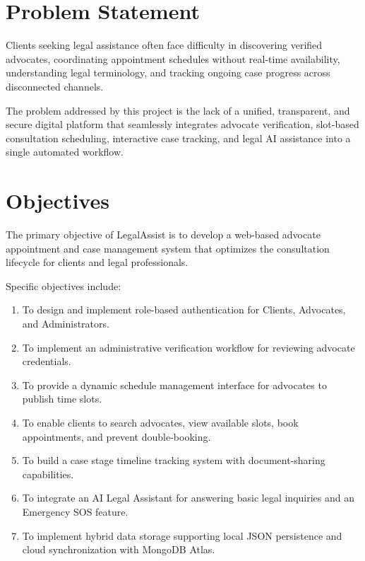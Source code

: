 \section{Problem Statement}
Clients seeking legal assistance often face difficulty in discovering verified advocates, coordinating appointment schedules without real-time availability, understanding legal terminology, and tracking ongoing case progress across disconnected channels. 

The problem addressed by this project is the lack of a unified, transparent, and secure digital platform that seamlessly integrates advocate verification, slot-based consultation scheduling, interactive case tracking, and legal AI assistance into a single automated workflow.

\section{Objectives}
The primary objective of LegalAssist is to develop a web-based advocate appointment and case management system that optimizes the consultation lifecycle for clients and legal professionals.

Specific objectives include:
\begin{enumerate}
    \item To design and implement role-based authentication for Clients, Advocates, and Administrators.
    \item To implement an administrative verification workflow for reviewing advocate credentials.
    \item To provide a dynamic schedule management interface for advocates to publish time slots.
    \item To enable clients to search advocates, view available slots, book appointments, and prevent double-booking.
    \item To build a case stage timeline tracking system with document-sharing capabilities.
    \item To integrate an AI Legal Assistant for answering basic legal inquiries and an Emergency SOS feature.
    \item To implement hybrid data storage supporting local JSON persistence and cloud synchronization with MongoDB Atlas.
\end{enumerate}

